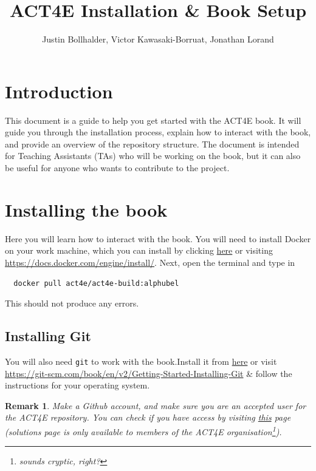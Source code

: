 \documentclass{article}
\title{ACT4E Installation \& Book Setup}
\author{ Justin Bollhalder, Victor Kawasaki-Borruat, Jonathan Lorand}
\newtheorem{remark}{Remark}
\begin{document}
    \maketitle

    \tableofcontents

    \section{Introduction}
    This document is a guide to help you get started with the ACT4E book.
    It will guide you through the installation process, explain how to interact with the book, and provide an overview of the repository structure.
    The document is intended for Teaching Assistants (TAs) who will be working on the book, but it can also be useful for anyone who wants to contribute to the project.

    \section{Installing the book}
    Here you will learn how to interact with the book.
    You will need to install Docker on your work machine, which you can install by clicking \href{https://docs.docker.com/engine/install/}{here} or visiting \url{https://docs.docker.com/engine/install/}.
    Next, open the terminal and type in
    \begin{verbatim}
  docker pull act4e/act4e-build:alphubel
\end{verbatim}
    This should not produce any errors.

    \subsection{Installing Git}
    You will also need \texttt{git} to work with the book.Install it from \href{https://git-scm.com/book/en/v2/Getting-Started-Installing-Git}{here} or visit \url{https://git-scm.com/book/en/v2/Getting-Started-Installing-Git} \& follow the instructions for your operating system.

    \begin{remark}
        Make a Github account, and make sure you are an accepted user for the ACT4E repository.
        You can check if you have access by visiting \href{https://github.com/ACT4E/ACT4E-solutions}{this} page (solutions page is only available to members of the ACT4E organisation\footnote{sounds cryptic, right?}).
    \end{remark}
\end{document}

